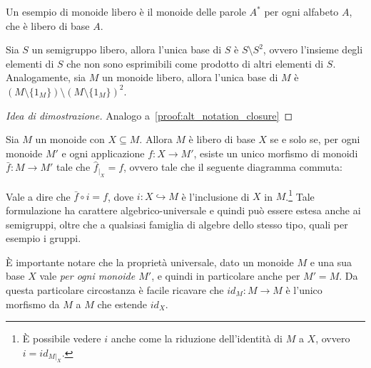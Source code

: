 Un esempio di monoide libero è il monoide delle parole \(A^*\) per ogni alfabeto \(A\), che è libero di base \(A\).

\begin{proposition}
  Sia \(S\) un semigruppo libero, allora l'unica base di \(S\) è \(S \setminus S^2\), ovvero l'insieme degli elementi di \(S\) che non sono esprimibili come prodotto di altri elementi di \(S\).
  Analogamente, sia \(M\) un monoide libero, allora l'unica base di \(M\) è \((M\setminus \{1_M\}) \setminus {(M\setminus \{1_M\})}^2\).
\end{proposition}
\begin{proof}[Idea di dimostrazione]
  Analogo a~\ref{proof:alt_notation_closure}
\end{proof}

\begin{theorem}
  Sia \(M\) un monoide con \(X \subseteq M\). Allora \(M\) è libero di base \(X\) se e solo se, per ogni monoide \(M'\) e ogni applicazione \(f: X \to M'\), esiste un unico morfismo di monoidi \(\bar{f}: M \to M'\) tale che \(\hat{f}_{|_X} = f\), ovvero tale che il seguente diagramma commuta:
  \begin{center}
  \end{center}
  Vale a dire che \(\bar{f} \circ i = f\), dove \(i: X \hookrightarrow M\) è l'inclusione di \(X\) in \(M\).\footnote{È possibile vedere \(i\) anche come la riduzione dell'identità di \(M\) a \(X\), ovvero \(i = id_{M|_X}\).}
  Tale formulazione ha carattere algebrico-universale e quindi può essere estesa anche ai semigruppi, oltre che a qualsiasi famiglia di algebre dello stesso tipo, quali per esempio i gruppi.
\end{theorem}

È importante notare che la proprietà universale, dato un monoide \(M\) e una sua base \(X\) vale \emph{per ogni monoide \(M'\)}, e quindi in particolare anche per \(M' = M\).
Da questa particolare circostanza è facile ricavare che \(id_M: M \to M\) è l'unico morfismo da \(M\) a \(M\) che estende \(id_X\).

